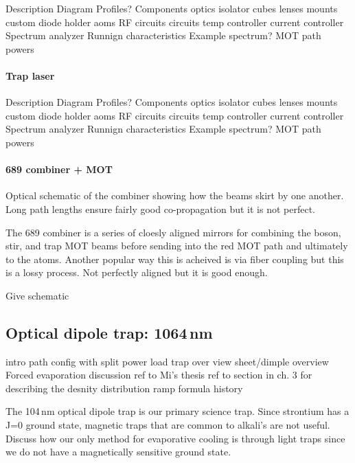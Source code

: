 Description
Diagram
	Profiles?
Components
	optics
		isolator
		cubes
		lenses
	mounts
		custom diode holder
	aoms
		RF circuits
	circuits
		temp controller
		current controller
	Spectrum analyzer
Runnign characteristics
	Example spectrum?
	MOT path powers

\paragraph{Trap laser}

Description
Diagram
	Profiles?
Components
	optics
		isolator
		cubes
		lenses
	mounts
		custom diode holder
	aoms
		RF circuits
	circuits
		temp controller
		current controller
	Spectrum analyzer
Runnign characteristics
	Example spectrum?
	MOT path powers
	
\paragraph{689 combiner + MOT}
Optical schematic of the combiner showing how the beams skirt by one another.
Long path lengths ensure fairly good co-propagation but it is not perfect.

The 689 combiner is a series of cloesly aligned mirrors for combining the boson, stir, and trap MOT beams before sending into the red MOT path and ultimately to the atoms.
Another popular way this is acheived is via fiber coupling but this is a lossy process.
Not perfectly aligned but it is good enough.

Give schematic



\subsection{Optical dipole trap: 1064\,nm} \label{ssec:1064sys}
\begin{outline}[enumerate]
\1 intro
\1 path 
	\2 config with split power
\1 load trap over view
\1 sheet/dimple overview
\1 Forced evaporation discussion
	\2 ref to Mi's thesis
	\2 ref to section in ch. 3 for describing the desnity distribution
	\2 ramp formula
\1 history
\end{outline}

The 104\,nm optical dipole trap is our primary science trap.
Since strontium has a J=0 ground state, magnetic traps that are common to alkali's are not useful.
Discuss how our only method for evaporative cooling is through light traps since we do not have a magnetically sensitive ground state.

